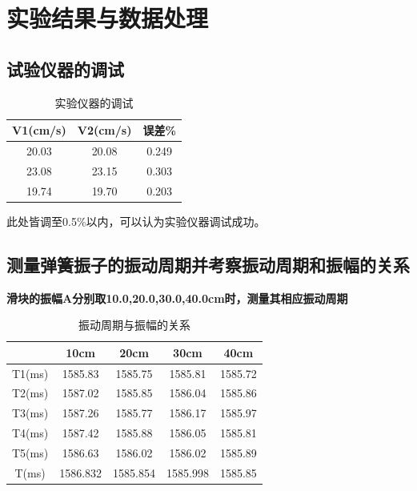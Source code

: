 \documentclass[UTF8]{article}
\theoremstyle{MyLineTheoremStyle} %
\theoremstyle{MyBlockTheoremStyle} %
\theoremstyle{MySubsubsectionStyle} %
\begin{document}
\cleardoublepage

\section{实验结果与数据处理}
\subsection{试验仪器的调试}
\begin{table}[H]
    \centering
    \begin{tabular}{|c|c|c|}
        \hline
        V1(cm/s) & V2(cm/s) & 误差\%\\
        \hline
        20.03 & 20.08 & 0.249\\
        \hline
        23.08 & 23.15 & 0.303\\
        \hline
        19.74 & 19.70 & 0.203\\
        \hline
    \end{tabular}
    \caption{\small 实验仪器的调试}
\end{table}
此处皆调至0.5\%以内，可以认为实验仪器调试成功。\\


\subsection{测量弹簧振子的振动周期并考察振动周期和振幅的关系}
\textbf{滑块的振幅A分别取10.0,20.0,30.0,40.0cm时，测量其相应振动周期}
\begin{table}[H]
    \centering
    \begin{tabular}{|c|c|c|c|c|}
        \hline
           & 10cm & 20cm & 30cm & 40cm\\
        \hline
        T1(ms) & 1585.83 & 1585.75 & 1585.81 & 1585.72\\
        \hline
        T2(ms) & 1587.02 & 1585.85 & 1586.04 & 1585.86\\
        \hline
        T3(ms) & 1587.26 & 1585.77 & 1586.17 & 1585.97\\
        \hline
        T4(ms) & 1587.42 & 1585.88 & 1586.05 & 1585.81\\
        \hline
        T5(ms) & 1586.63 & 1586.02 & 1586.02 & 1585.89\\
        \hline
        T(ms) & 1586.832 & 1585.854 & 1585.998 & 1585.85\\
        \hline
    \end{tabular}
    \caption{\small 振动周期与振幅的关系}
\end{table}
\end{document}
